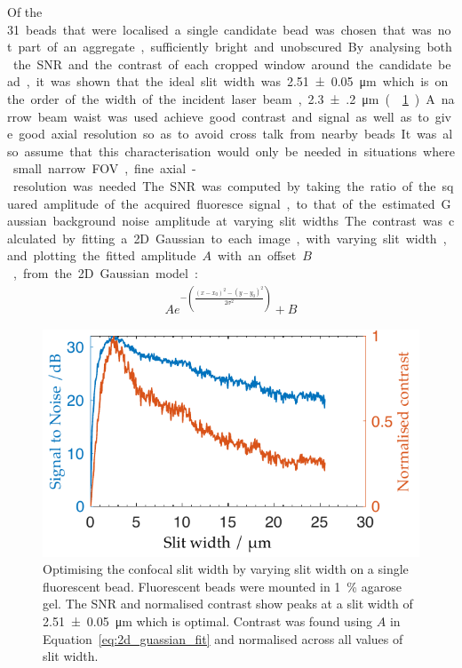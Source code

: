 Of the \SI{31} beads that were localised a single candidate bead was chosen that
was not part of an aggregate,
sufficiently bright and unobscured.
By analysing both the \gls{SNR} and the contrast of each cropped window around the candidate bead, it was shown that the ideal slit width was \SI{2.51(5)}{\micro\metre} which is on the order of the width of the incident laser beam, \SI{2.3(2)}{\micro\metre} (\figurename~\ref{fig:optimal_slit_snr_contrast}).
A narrow beam waist was used achieve good contrast and signal as well as to give good axial resolution so as to avoid cross talk from nearby beads.
It was also assume that this characterisation would only be needed in situations where small narrow \gls{FOV}, fine axial-resolution was needed.
The \gls{SNR} was computed by taking the ratio of the squared amplitude of the acquired fluoresce signal, to that of the estimated Gaussian background noise amplitude at varying slit widths.
The contrast was calculated by fitting a \gls{2D} Gaussian to each image, with varying slit width, and plotting the fitted amplitude \(A\) with an offset \(B\), from the \gls{2D} Gaussian model:
\begin{align}
  A e^{-\left(\frac{{(x-x_0)}^2-{(y-y_0)}^2}{2\sigma^2}\right)}+B \label{eq:2d_guassian_fit}
\end{align}
\begin{figure}
  \centering
  \includegraphics{Chapters/dualslit/Figs/PDF/optimal_slit_snr_contrast}
  \caption[Optimising the confocal slit width by varying slit width on a single fluorescent bead.]{
  Optimising the confocal slit width by varying slit width on a single fluorescent bead.
  Fluorescent beads were mounted in \SI{1}{\percent} agarose gel.
  The \gls{SNR} and normalised contrast show peaks at a slit width of \SI{2.51(5)}{\micro\metre} which is optimal.
  Contrast was found using \( A\) in Equation~\eqref{eq:2d_guassian_fit} and normalised across all values of slit width.
  }\label{fig:optimal_slit_snr_contrast}
\end{figure}
